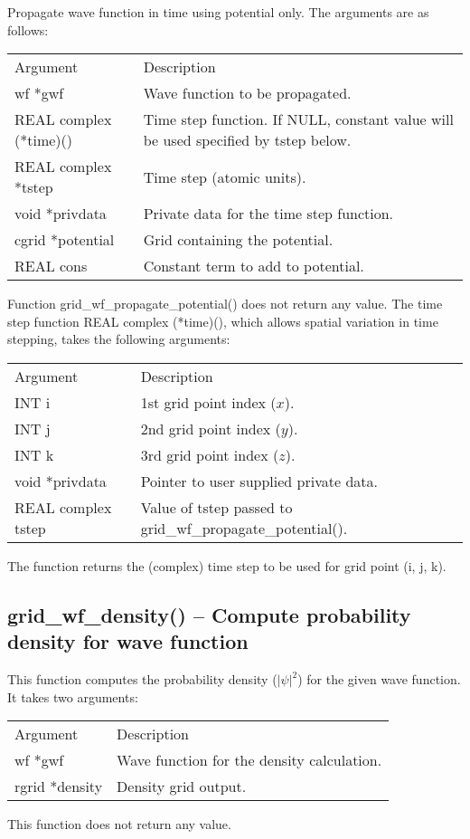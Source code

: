 \documentclass[12pt,letterpaper]{report}
\begin{document}
Propagate wave function in time using potential only. The arguments are as follows:
\begin{longtable}{p{} p{}}
Argument & Description\\
\cline{1-2}
wf *gwf & Wave function to be propagated.\\
REAL complex (*time)() & Time step function. If NULL, constant value will be used specified by tstep below.\\
REAL complex *tstep & Time step (atomic units).\\
void *privdata & Private data for the time step function.\\                                                                            
cgrid *potential & Grid containing the potential.\\
REAL cons & Constant term to add to potential.\\
\end{longtable}
\noindent
Function grid\_wf\_propagate\_potential() does not return any value. The time step function REAL complex (*time)(), which allows spatial variation in time stepping, takes the following arguments:
\begin{longtable}{p{} p{}}
Argument & Description\\
\cline{1-2}
INT i & 1st grid point index ($x$).\\
INT j & 2nd grid point index ($y$).\\
INT k & 3rd grid point index ($z$).\\
void *privdata & Pointer to user supplied private data.\\
REAL complex tstep & Value of tstep passed to grid\_wf\_propagate\_potential().\\
\end{longtable}
\noindent
The function returns the (complex) time step to be used for grid point (i, j, k).

\subsection{grid\_wf\_density() -- Compute probability density for wave function}

This function computes the probability density ($|\psi|^2$) for the given wave function. It takes two arguments:
\begin{longtable}{p{} p{}}
Argument & Description\\
\cline{1-2}
wf *gwf & Wave function for the density calculation.\\
rgrid *density & Density grid output.\\
\end{longtable}
\noindent
This function does not return any value.
\end{document}
